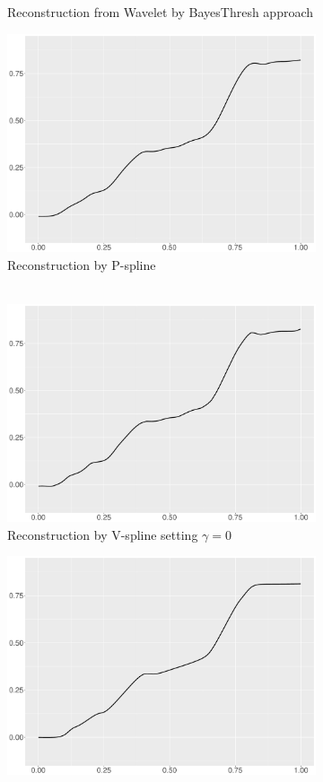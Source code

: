 \begin{figure}
\begin{subfigure}{0.45\textwidth}
    \caption{Reconstruction from Wavelet by BayesThresh approach}
    \end{subfigure}
    \begin{subfigure}{0.45\textwidth}
    \centering
    \includegraphics[width=\linewidth,height=0.45\textwidth]{Chapters/02TractorSplineTheory/plot/ggplot/ggBlocksPSpline.pdf}
    \caption{Reconstruction by P-spline \\\mbox{  } }
    \end{subfigure}
    \begin{subfigure}{0.45\textwidth}
    \centering
    \includegraphics[width=\linewidth,height=0.45\textwidth]{Chapters/02TractorSplineTheory/plot/ggplot/ggBlocksGamma.pdf}
    \caption{Reconstruction by V-spline setting $\gamma=0$}
    \end{subfigure}
  \begin{subfigure}{0.45\textwidth}
    \centering
    \includegraphics[width=\linewidth,height=0.45\textwidth]{Chapters/02TractorSplineTheory/plot/ggplot/ggBlocksTractorAPT.pdf}

\end{subfigure}
\end{figure}
